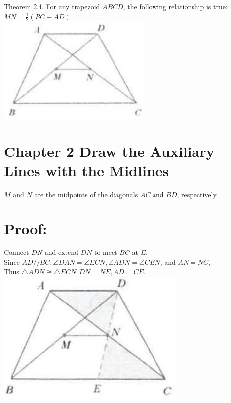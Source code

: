 \documentclass[10pt]{article}
\begin{document}
Theorem 2.4. For any trapezoid \(A B C D\), the following relationship is true:\\
\(M N=\frac{1}{2}(B C-A D)\)\\
\includegraphics[max width=\textwidth, center]{2025_04_17_97bc1f7e44d93c271a88g-034}

\section*{Chapter 2 Draw the Auxiliary Lines with the Midlines}
\(M\) and \(N\) are the midpoints of the diagonals \(A C\) and \(B D\), respectively.

\section*{Proof:}
Connect \(D N\) and extend \(D N\) to meet \(B C\) at \(E\).\\
Since \(A D / / B C, \angle D A N=\angle E C N, \angle A D N=\angle C E N\), and \(A N=N C\),\\
Thus \(\triangle A D N \cong \triangle E C N, D N=N E, A D=C E\).\\
\includegraphics[max width=\textwidth, center]{2025_04_17_97bc1f7e44d93c271a88g-035(3)}
\end{document}
